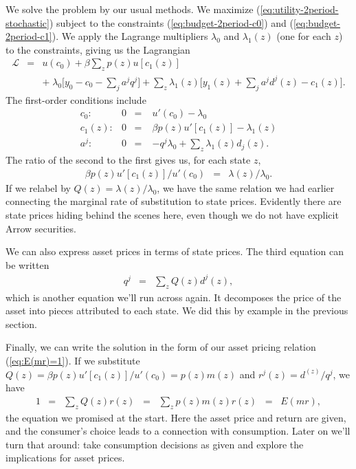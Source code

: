 \documentclass[11pt]{article}
\begin{document}
We solve the problem by our usual methods.
We maximize (\ref{eq:utility-2period-stochastic})
subject to the constraints (\ref{eq:budget-2period-c0}) and (\ref{eq:budget-2period-c1}).
We apply the Lagrange multipliers $\lambda_0$ and $\lambda_1(z)$ (one for each $z$) to the constraints,
giving us the Lagrangian
\begin{eqnarray*}
    \mathcal{L} &=& u(c_0) + \beta \sum_z p(z) u[c_1(z)] \\
        &&   + \; \lambda_0 \Big[ y_0 - c_0 - \sum_j a^j q^j \Big]
        + \sum_z \lambda_1(z) \Big[ y_1(z) + \sum_j a^j d^j(z) - c_1(z) \Big] .
\end{eqnarray*}
The first-order conditions include
\begin{eqnarray*}
  c_0: &        0 \;\;=& u'(c_0) - \lambda_0 \\
  c_1(z): &     0 \;\;=& \beta p(z) u'[c_1(z)] - \lambda_1(z) \\
  a^j: &        0 \;\;=& - q^j \lambda_0 + \sum_z \lambda_1(z) d_j(z) .
\end{eqnarray*}
The ratio of the second to the first gives us, for each state $z$,
\begin{eqnarray*}
    \beta p(z) u'[c_1(z)] / u'(c_0) &=& \lambda(z)/\lambda_0 .
\end{eqnarray*}
If we relabel by $Q(z) = \lambda(z)/\lambda_0$, we have the same relation
we had earlier connecting  the marginal rate of substitution to state prices.
Evidently there are state prices hiding behind the scenes here,
even though we do not have explicit Arrow securities.

We can also express asset prices in terms of state prices.
The third equation can be written
\begin{eqnarray*}
    q^j &=& \sum_z Q(z) d^j(z) ,
\end{eqnarray*}
which is another equation we'll run across again.
It decomposes the price of the asset into pieces attributed to each state.
We did this by example in the previous section.

Finally, we can write the solution in the form of
our asset pricing relation (\ref{eq:E(mr)=1}).
If we substitute
$ Q(z) = \beta p(z) u'[c_1(z)] / u'(c_0) = p(z) m(z)$
and $r^j(z) = d^(z)/q^j $,
we have
\begin{eqnarray*}
    1 &=& \sum_z Q(z) r(z) \;\;=\;\; \sum_z p(z) m(z) r(z) \;\;=\;\; E (mr) ,
\end{eqnarray*}
the equation we promised at the start.
Here the asset price and return are given,
and the consumer's choice leads to a connection with consumption.
Later on we'll turn that around:
take consumption decisions as given and explore
the implications for asset prices.
\end{document}

